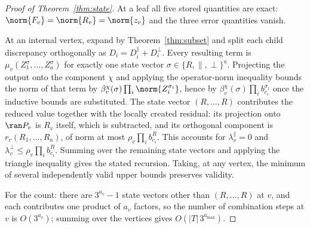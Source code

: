 \begin{proof}[Proof of Theorem~\ref{thm:state}]
At a leaf all five stored quantities are exact: $\norm{F_v}=\norm{R_v}=\norm{z_v}$ and
the three error quantities vanish.

At an internal vertex, expand by Theorem~\ref{thm:subset} and split each child
discrepancy orthogonally as $D_i=D_i^{\parallel}+D_i^{\perp}$. Every resulting term is
$\mu_v(Z_1^\sigma,\ldots,Z_a^\sigma)$ for exactly one state vector
$\sigma\in\{R,\parallel,\perp\}^{a}$. Projecting the output onto the component $\chi$ and
applying the operator-norm inequality bounds the norm of that term by
$\beta_v^{\chi}(\sigma)\prod_i\norm{Z_i^{\sigma_i}}$, hence by
$\beta_v^{\chi}(\sigma)\prod_ib_{c_i}^{\sigma_i}$ once the inductive bounds are
substituted. The state vector $(R,\ldots,R)$ contributes the reduced value together with
the locally created residual: its projection onto $\ran P_v$ is $R_v$ itself, which is
subtracted, and its orthogonal component is $r_v(R_1,\ldots,R_a)$, of norm at most
$\rho_v\prod_ib_{c_i}^{R}$. This accounts for $\lambda_v^{\parallel}=0$ and
$\lambda_v^{\perp}\le\rho_v\prod_ib_{c_i}^{R}$. Summing over the remaining state vectors
and applying the triangle inequality gives the stated recursion. Taking, at any vertex,
the minimum of several independently valid upper bounds preserves validity.

For the count: there are $3^{a_v}-1$ state vectors other than $(R,\ldots,R)$ at $v$, and
each contributes one product of $a_v$ factors, so the number of combination steps at $v$
is $O(3^{a_v})$; summing over the vertices gives $O(\lvert T\rvert\,3^{a_{\max}})$.
\end{proof}

